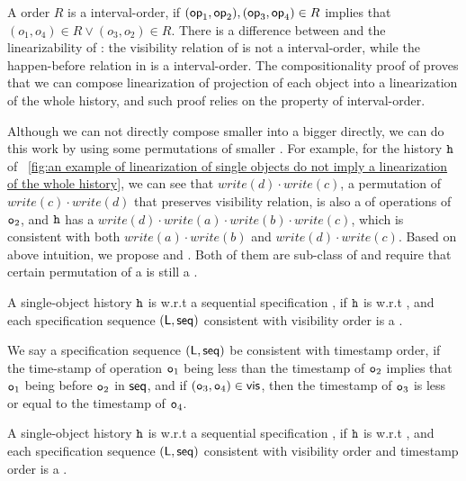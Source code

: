 A order $R$ is a interval-order, if $(\mathsf{op}_1,\mathsf{op}_2), (\mathsf{op}_3,\mathsf{op}_4) \in R$ implies that $(o_1,o_4) \in R \vee (o_3,o_2) \in R$. There is a difference between \crdtlin{} and the linearizability of \cite{HerlihyW90}: the visibility relation of \crdtlin{} is not a interval-order, while the happen-before relation in \cite{HerlihyW90} is a interval-order. The compositionality proof of \cite{HerlihyW90} proves that we can compose linearization of projection of each object into a linearization of the whole history, and such proof relies on the property of interval-order.

Although we can not directly compose smaller \crdtlinearization{} into a bigger \crdtlinearization{} directly, we can do this work by using some permutations of smaller \crdtlinearization{}. For example, for the history $\mathtt{h}$ of \figurename~\ref{fig:an example of linearization of single objects do not imply a linearization of the whole history}, we can see that $\mathit{write}(d) \cdot \mathit{write}(c)$, a permutation of \crdtlinearization{} $\mathit{write}(c) \cdot \mathit{write}(d)$ that preserves visibility relation, is also a \crdtlinearization{} of operations of $\mathtt{o}_2$, and $\mathtt{h}$ has a \crdtlinearization{} $\mathit{write}(d) \cdot \mathit{write}(a) \cdot \mathit{write}(b) \cdot \mathit{write}(c)$, which is consistent with both $\mathit{write}(a) \cdot \mathit{write}(b)$ and $\mathit{write}(d) \cdot \mathit{write}(c)$. Based on above intuition, we propose \tzerolin{} and \tonelin{}. Both of them are sub-class of \crdtlin{} and require that certain permutation of a \crdtlinearization{} is still a \crdtlinearization{}.

\begin{definition}[\tzerolin{}]
\label{definition:t0-linearizability}
A single-object history $\mathtt{h}$ is \tzerolinearizable{} w.r.t a sequential specification \Spec{}, if $\mathtt{h}$ is \crdtlinearizable{} w.r.t \Spec{}, and each specification sequence $(\mathsf{L}, \mathsf{seq})$ consistent with visibility order is a \crdtlinearization{}.
\end{definition}

We say a specification sequence $(\mathsf{L}, \mathsf{seq})$ be consistent with timestamp order, if the time-stamp of operation $\mathtt{o}_1$ being less than the timestamp of $\mathtt{o}_2$ implies that $\mathtt{o}_1$ being before $\mathtt{o}_2$ in $\mathsf{seq}$, and if $(\mathtt{o}_3,\mathtt{o}_4) \in \mathsf{vis}$, then the timestamp of $\mathtt{o}_3$ is less or equal to the timestamp of $\mathtt{o}_4$.

\begin{definition}[\tonelin{}]
\label{definition:t1-linearizability}
A single-object history $\mathtt{h}$ is \tonelinearizable{} w.r.t a sequential specification \Spec{}, if $\mathtt{h}$ is \crdtlinearizable{} w.r.t \Spec{}, and each specification sequence $(\mathsf{L}, \mathsf{seq})$ consistent with visibility order and timestamp order is a \crdtlinearization{}.
\end{definition}






